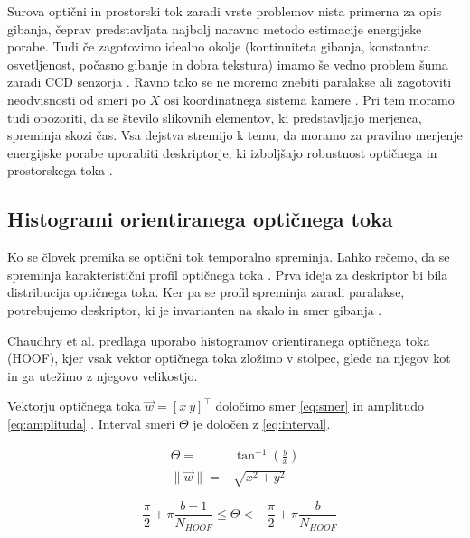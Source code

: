 Surova optični in prostorski tok zaradi vrste problemov nista primerna za opis gibanja, čeprav predstavljata najbolj naravno metodo estimacije energijske porabe. Tudi če zagotovimo idealno okolje (kontinuiteta gibanja, konstantna osvetljenost, počasno gibanje in dobra tekstura) imamo še vedno problem šuma zaradi CCD senzorja \cite{wedel2011stereo}. Ravno tako se ne moremo znebiti paralakse ali zagotoviti neodvisnosti od smeri po $X$ osi koordinatnega sistema kamere \cite{chaudhry2009histograms}. Pri tem moramo tudi opozoriti, da se število slikovnih elementov, ki predstavljajo merjenca, spreminja skozi čas. Vsa dejstva stremijo k temu, da moramo za pravilno merjenje energijske porabe uporabiti deskriptorje, ki izboljšajo robustnost optičnega in prostorskega toka \cite{chaudhry2009histograms}. 







\subsection{Histogrami orientiranega optičnega toka}\label{sec:hoof}
Ko se človek premika se optični tok temporalno spreminja. Lahko rečemo, da se spreminja karakteristični profil optičnega toka \cite{chaudhry2009histograms}. Prva ideja za deskriptor bi bila distribucija optičnega toka. Ker pa se profil spreminja zaradi paralakse, potrebujemo deskriptor, ki je invarianten na skalo in smer gibanja \cite{chaudhry2009histograms}.

Chaudhry et al. \cite{chaudhry2009histograms} predlaga uporabo histogramov orientiranega optičnega toka (HOOF), kjer vsak vektor optičnega toka zložimo v stolpec, glede na njegov kot in ga utežimo z njegovo velikostjo.

Vektorju optičnega toka $\vec{w} = [x~y]^\top$ določimo smer \eqref{eq:smer} in amplitudo \eqref{eq:amplituda} \cite{chaudhry2009histograms}. Interval smeri $\Theta$ je določen z \eqref{eq:interval}. 

\begin{align}
	\Theta = & \tan^{-1}\left( \frac{y}{x} \right) \label{eq:smer} \\
    \| \vec{w} \| = & \sqrt{x^2 + y^2} \label{eq:amplituda}
\end{align}

\begin{equation}\label{eq:interval}
	-\frac{\pi}{2} + \pi \frac{b - 1}{N_{HOOF}} \leq \Theta < - \frac{\pi}{2} + \pi \frac{b}{N_{HOOF}}
\end{equation}

